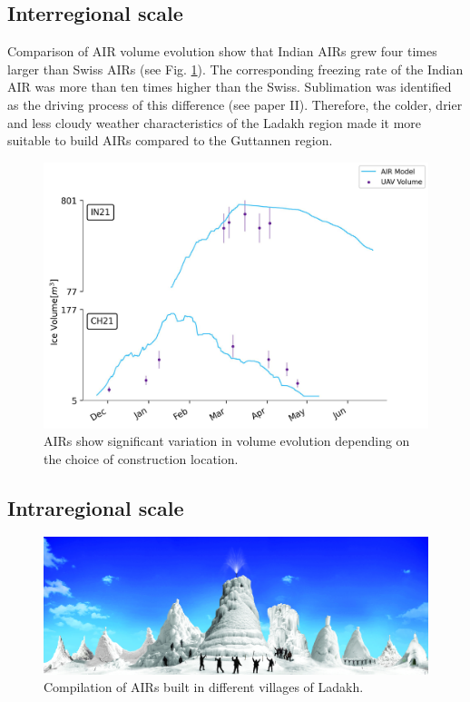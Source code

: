 \subsection{Interregional scale}

Comparison of AIR volume evolution show that Indian AIRs grew four times larger than Swiss AIRs (see Fig.
\ref{fig:2AIRs}). The corresponding freezing rate of the Indian AIR was more than ten times higher than the
Swiss. Sublimation was identified as the driving process of this difference (see paper II). Therefore, the
colder, drier and less cloudy weather characteristics of the Ladakh region made it more suitable to build AIRs
compared to the Guttannen region.

\begin{figure}[htb]
\centering
\includegraphics[width=12cm]{figs/IN21vsCH21.jpg}
\caption{AIRs show significant variation in volume evolution depending on the choice of construction location.}
\label{fig:2AIRs}
\end{figure}

\subsection{Intraregional scale}

\begin{figure}[htb]
	\includegraphics[width=\textwidth]{figs/AIRs_Ladakh}
	\caption{Compilation of AIRs built in different villages of Ladakh.}
	\label{fig:airs_ladakh}
\end{figure}

